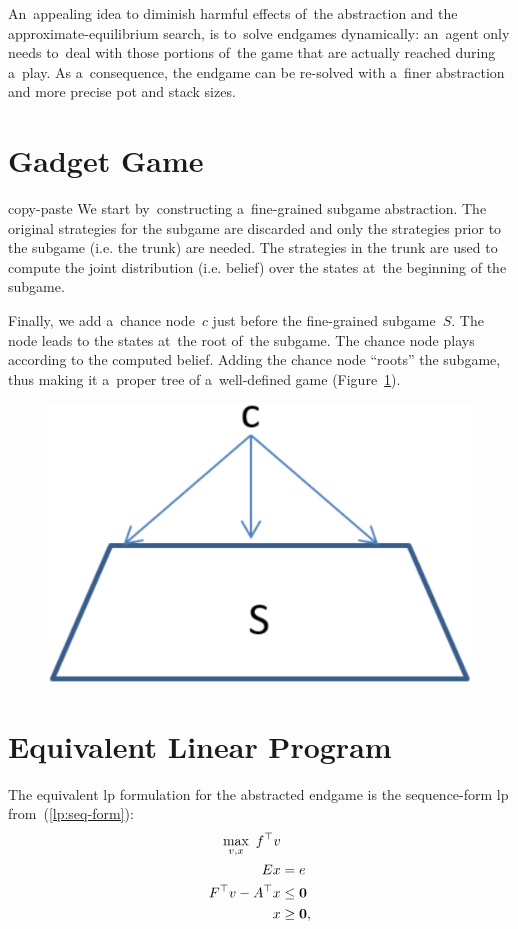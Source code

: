 An~appealing idea to diminish harmful effects of~the abstraction and the approximate-equilibrium search, is to~solve endgames dynamically:
an~agent only needs to~deal with those portions of~the game that are actually reached during a~play.
As a~consequence, the endgame can be re-solved with a~finer abstraction and more precise pot and stack sizes.

\section{Gadget Game}
\todo copy-paste
We start by~constructing a~fine-grained subgame abstraction.
The original strategies for the subgame are discarded and only the strategies prior to the subgame (i.e. the trunk) are needed.
The strategies in the trunk are used to compute the joint distribution (i.e. belief) over the states at~the beginning of the subgame.

Finally, we add a~chance node~$c$ just before the fine-grained subgame~$S$.
The node leads to the states at~the root of~the subgame.
The chance node plays according to the computed belief.
Adding the chance node ``roots'' the subgame, thus making it a~proper tree of a~well-defined game (Figure~\ref{fig:endgame-solving-gadget}).
\begin{figure}[H]
  \centering
  \includegraphics[width=.3\textwidth]{../img/endgame-solving-gadget.png}
  \label{fig:endgame-solving-gadget}
\end{figure}

\section{Equivalent Linear Program}
The equivalent \acrshort{lp} formulation for the abstracted endgame is the sequence-form \acrshort{lp} from~(\ref{lp:seq-form}):
\begin{equation*}
  \begin{split}
    \max_{v, x}\  f^\top v & \\
    Ex &= e \\
    F^\top v - A^\top x &\le \boldsymbol{0} \\
    x &\ge \boldsymbol{0},
  \end{split}
\end{equation*}


